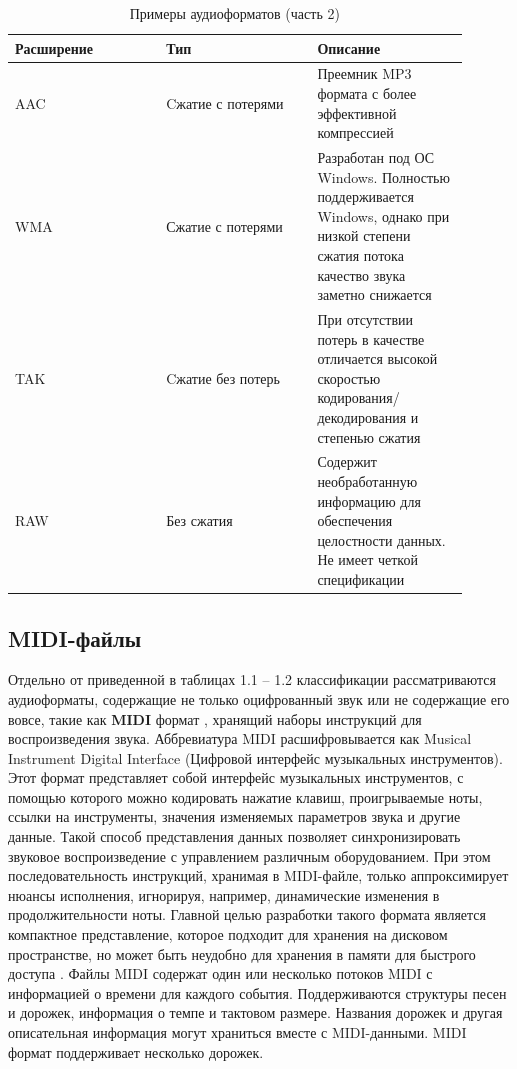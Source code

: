 \begin{table}[H]
\caption{Примеры аудиоформатов (часть 2)}
\begin{center}
\begin{tabular}{|p{0.3\linewidth}|p{0.3\linewidth}|p{0.3\linewidth}|}
		\hline
		Расширение & Тип & Описание \\ [0.5ex] 
 		\hline
		AAC & Cжатие с потерями & Преемник MP3 формата с более эффективной компрессией\\
		\hline
		WMA & Сжатие с потерями & Разработан под ОС Windows. Полностью поддерживается Windows, однако при низкой степени сжатия потока качество звука заметно снижается\\
		\hline
		TAK & Cжатие без потерь & При отсутствии потерь в качестве отличается высокой скоростью кодирования/декодирования и степенью сжатия\\
		\hline
		RAW & Без сжатия & Содержит необработанную информацию для обеспечения целостности данных. Не имеет четкой спецификации\\
		\hline
\end{tabular}
\end{center}
\end{table}	

\subsection{MIDI-файлы}

Отдельно от приведенной в таблицах 1.1 -- 1.2 классификации рассматриваются аудиоформаты, содержащие не только оцифрованный звук или не содержащие его вовсе, такие как \textbf{MIDI} формат \cite{AITMAWC}, хранящий наборы инструкций для воспроизведения звука. Аббревиатура MIDI расшифровывается как Musical Instrument Digital Interface (Цифровой интерфейс музыкальных инструментов). Этот формат представляет собой интерфейс музыкальных инструментов, с помощью которого можно кодировать нажатие клавиш, проигрываемые ноты, ссылки на инструменты, значения изменяемых параметров звука и другие данные. Такой способ представления данных позволяет синхронизировать звуковое воспроизведение с управлением различным оборудованием.
При этом последовательность инструкций, хранимая в MIDI-файле, только аппроксимирует нюансы исполнения, игнорируя, например, динамические изменения в продолжительности ноты.
Главной целью разработки такого формата является компактное представление, которое подходит для хранения на дисковом пространстве, но может быть неудобно для хранения в памяти для быстрого доступа \cite{SMFFS}.
Файлы MIDI содержат один или несколько потоков MIDI с информацией о времени для каждого события. Поддерживаются структуры песен и дорожек, информация о темпе и тактовом размере. Названия дорожек и другая описательная информация могут храниться вместе с MIDI-данными. MIDI формат поддерживает несколько дорожек.

